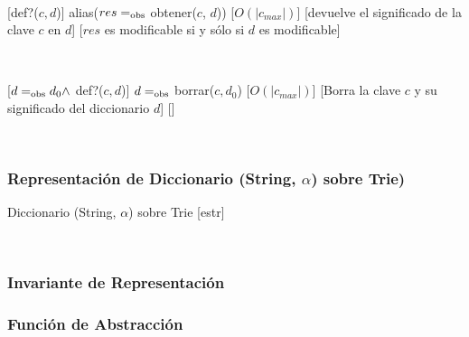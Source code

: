 ~

[def?($c, d$)]
{alias($res =_{\mathrm{obs}}$ obtener($c$, $d$))}
[$O(|c_{max}|)$]
[devuelve el significado de la clave $c$ en $d$]
[$res$ es modificable si y sólo si $d$ es modificable]

~

[$d =_{\mathrm{obs}} d_0 \land$ def?($c, d$)]
{$d =_{\mathrm{obs}}$ borrar($c, d_0$)}
[$O(|c_{max}|)$]
[Borra la clave $c$ y su significado del diccionario $d$]
[]

~


\subsubsection{Representación de Diccionario (String, \texorpdfstring{$\alpha$}{α}) sobre Trie)}

\begin{Estructura}{ Diccionario (String, $\alpha$) sobre Trie }[estr]
	\begin{Tupla}[estr]
	\end{Tupla}

	~

	\begin{Tupla}[Nodo]
	\end{Tupla}

\end{Estructura}

\subsubsection{Invariante de Representación}



\tadAxioma{hijoValido(nodo)}{
	nodo == NULL $\oluego$ ($\forall i \in [0..256)$) (hijoValido(nodo.hijos[i]))
}

\subsubsection{Función de Abstracción}


